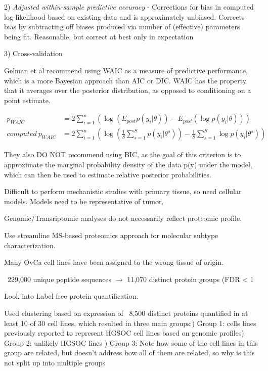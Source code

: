 \documentclass[11pt]{labbook}
\begin{document}
2) \textit{Adjusted within-sample predictive accuracy} - Corrections for bias in computed log-likelihood based on existing data and is approximately unbiased. Corrects bias by subtracting off biases produced via number of (effective) parameters being fit. Reasonable, but correct at best only in expectation

3) Cross-validation


Gelman et al recommend using WAIC as a measure of predictive performance, which is a more Bayesian approach than AIC or DIC. WAIC has the property that it averages over the posterior distribution, as opposed to conditioning on a point estimate. 

\begin{align*}
p_{WAIC} &= 2 \sum_{i=1}^n\left(\log{(E_{post}p(y_i|\theta))} - E_{post}(\log{p(y_i|\theta)})\right) \\
computed\ p_{WAIC} &= 2 \sum_{i=1}^n\left(\log{\left(\frac{1}{S} \sum_{s=1}^S p(y_i|\theta^s)\right)} - \frac{1}{S}\sum_{s=1}^S\log{p(y_i|\theta^s)}\right)
\end{align*}

They also DO NOT recommend using BIC, as the goal of this criterion is to approximate the marginal probability density of the data p(y) under the model, which can then be used to estimate relative posterior probabilities. 






Difficult to perform mechanistic studies with primary tissue, so need cellular models. Models need to be representative of tumor. 

Genomic/Transriptomic analyses do not necessarily reflect proteomic profile. 

Use streamline MS-based proteomics approach for molecular subtype characterization.

Many OvCa cell lines have been assigned to the wrong tissue of origin. 


~229,000 unique peptide sequences $\rightarrow$ 11,070 distinct protein groups (FDR < 1%

Look into Label-free protein quantification. 

Used clustering based on expression of ~8,500 distinct proteins quantified in at least 10 of 30 cell lines, which resulted in three main groups:) Group 1: cells lines previously reported to represent HGSOC cell lines based on genomic profiles) Group 2: unlikely HGSOC lines ) Group 3: Note how some of the cell lines in this group are related, but doesn't address how all of them are related, so why is this not split up into multiple groups
 
\end{document}
